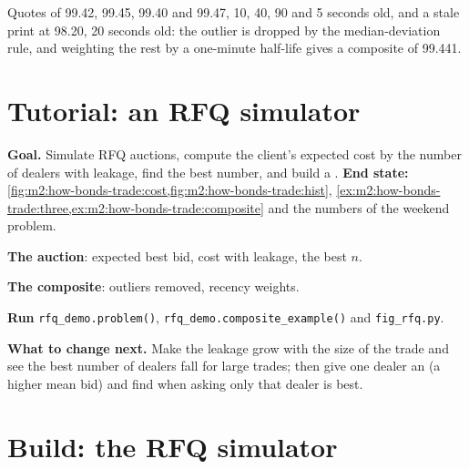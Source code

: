 \begin{example}[A composite]\label{ex:m2:how-bonds-trade:composite}
Quotes of 99.42, 99.45, 99.40 and 99.47, 10, 40, 90 and 5 seconds old, and a stale
print at 98.20, 20 seconds old: the outlier is dropped by the median-deviation rule,
and weighting the rest by a one-minute half-life gives a composite of 99.441.
\end{example}

\section{Tutorial: an RFQ simulator}\label{tut:m2:how-bonds-trade:rfq}

\begin{tutorial}
\textbf{Goal.} Simulate RFQ auctions, compute the client's expected cost by the number
of dealers with leakage, find the best number, and build a .
\textbf{End state:} \cref{fig:m2:how-bonds-trade:cost,fig:m2:how-bonds-trade:hist},
\cref{ex:m2:how-bonds-trade:three,ex:m2:how-bonds-trade:composite} and the numbers of
the weekend problem.
\begin{tutsteps}
\item \textbf{The auction}: expected best bid, cost with leakage, the best $n$.
\label{lst:m2:how-bonds-trade:rfq}
\item \textbf{The composite}: outliers removed, recency weights.
\label{lst:m2:how-bonds-trade:composite}
\item \textbf{Run} \texttt{rfq\_demo.problem()}, \texttt{rfq\_demo.composite\_example()}
and \texttt{fig\_rfq.py}.
\end{tutsteps}
\textbf{What to change next.} Make the leakage grow with the size of the trade and see
the best number of dealers fall for large trades; then give one dealer an  (a
higher mean bid) and find when asking only that dealer is best.
\end{tutorial}

\section{Build: the RFQ simulator}\label{bld:m2:how-bonds-trade:rfq}

